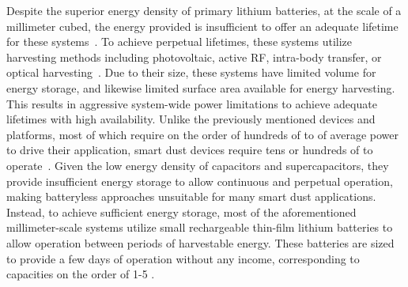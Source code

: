 Despite the superior energy density of primary lithium batteries, at the scale of a millimeter cubed, the energy provided is insufficient to offer an adequate lifetime for these systems~\cite{lee2013modular}.
To achieve perpetual lifetimes, these systems utilize harvesting methods including photovoltaic, active RF, intra-body transfer, or optical harvesting~\cite{wu20180, lee2013modular, nazari2019novel}.
Due to their size, these systems have limited volume for energy storage, and likewise limited surface area available for energy harvesting.
This results in aggressive system-wide power limitations to achieve adequate lifetimes with high availability.
Unlike the previously mentioned devices and platforms, most of which require on the order of hundreds of \ssi{\micro\watt} to \ssi{\milli\watt} of average power to drive their application, smart dust devices require tens or hundreds of \ssi{\nano\watt} to operate~\cite{lee2013modular,kim2014millimeter,chen2014injectable,wu20180}.
Given the low energy density of capacitors and supercapacitors, they provide insufficient energy storage to allow continuous and perpetual operation, making batteryless approaches unsuitable for many smart dust applications.
Instead, to achieve sufficient energy storage, most of the aforementioned millimeter-scale systems utilize small rechargeable thin-film lithium batteries to allow operation between periods of harvestable energy. These batteries are sized to provide a few days of operation without any income, corresponding to capacities on the order of 1-5 \ssi{\micro\Ah}.

